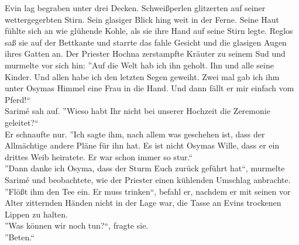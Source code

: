 Evin lag begraben unter drei Decken. Schweißperlen glitzerten auf seiner wettergegerbten Stirn. 
Sein glasiger Blick hing weit in der Ferne. Seine Haut fühlte sich an wie glühende Kohle, als sie 
ihre Hand auf seine Stirn legte.  Reglos saß sie auf der Bettkante und starrte das fahle Gesicht und 
die glasigen Augen ihres Gatten an. Der Priester Hochna zerstampfte Kräuter zu seinem Sud und 
murmelte vor sich hin: ''Auf die Welt hab ich ihn geholt. Ihn und alle seine Kinder. Und allen 
habe ich den letzten Segen geweiht. Zwei mal gab ich ihm unter Osymas Himmel eine Frau in die Hand. 
Und dann fällt er mir einfach vom Pferd!``\\
Sarimé sah auf. ''Wieso habt Ihr nicht bei unserer Hochzeit die Zeremonie geleitet?``\\
Er schnaufte nur. ''Ich sagte ihm, nach allem was geschehen ist, dass der Allmächtige andere Pläne 
für ihn hat. Es ist nicht Osymas Wille, dass er ein drittes Weib heiratete. Er war schon immer so 
stur.``\\
''Dann danke ich Osyma, dass der Sturm Euch zurück geführt hat``, murmelte Sarimé und beobachtete, 
wie der Priester einen kühlenden Umschlag anbrachte. ''Flößt ihm den Tee ein. Er muss trinken``, 
befahl er, nachdem er mit seinen vor Alter zitternden Händen nicht in der Lage war, die Tasse an 
Evins trockenen Lippen zu halten.\\
''Was können wir noch tun?``, fragte sie.\\
''Beten.``\\

